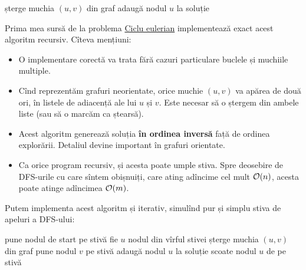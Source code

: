 \documentclass[../main.tex]{subfiles}
\begin{document}
\begin{algorithm}[H]
  \caption{Găsirea unui ciclu eulerian, algoritm recursiv}
  \begin{algorithmic}[1]
        \State șterge muchia $(u, v)$ din graf
        \State {}
      \EndFor
      \State adaugă nodul $u$ la soluție
    \EndProcedure
  \end{algorithmic}
\end{algorithm}

Prima mea sursă de la problema \hyperref[problem:ciclu-eulerian]{Ciclu eulerian} implementează exact acest algoritm recursiv. Cîteva mențiuni:

\begin{itemize}
  \item O implementare corectă va trata fără cazuri particulare buclele și muchiile multiple.
  \item Cînd reprezentăm grafuri neorientate, orice muchie $(u,v)$ va apărea de două ori, în listele de adiacență ale lui $u$ și $v$. Este necesar să o ștergem din ambele liste (sau să o marcăm ca ștearsă).
  \item Acest algoritm generează soluția \textbf{în ordinea inversă} față de ordinea explorării. Detaliul devine important în grafuri orientate.
  \item Ca orice program recursiv, și acesta poate umple stiva. Spre deosebire de DFS-urile cu care sîntem obișnuiți, care ating adîncime cel mult $\mathcal{O}(n)$, acesta poate atinge adîncimea $\mathcal{O}(m)$.
\end{itemize}

Putem implementa acest algoritm și iterativ, simulînd pur și simplu stiva de apeluri a DFS-ului:

\begin{algorithm}[H]
  \caption{Găsirea unui ciclu eulerian, algoritm iterativ}
  \begin{algorithmic}[1]
      \State pune nodul de start pe stivă
        \State fie $u$ nodul din vîrful stivei
          \State șterge muchia $(u, v)$ din graf
          \State pune nodul $v$ pe stivă
        \Else
          \State adaugă nodul $u$ la soluție
          \State scoate nodul $u$ de pe stivă
        \EndIf
      \EndWhile
    \EndProcedure
  \end{algorithmic}
\end{algorithm}
\end{document}
